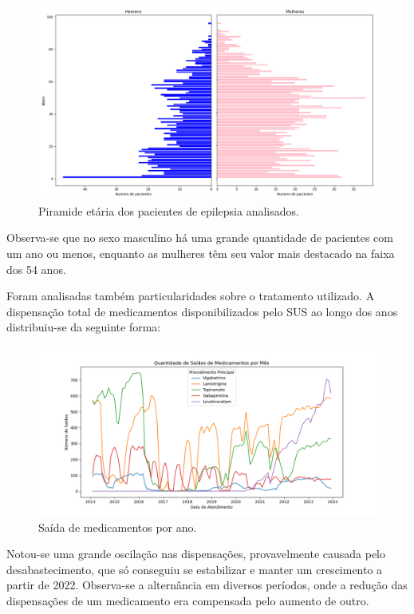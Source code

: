 \documentclass[article,a4paper,12pt,brazil,sumario=tradicional]{abntex2}
\begin{document}
\begin{figure}[ht!]
    \centering
    \includegraphics[width=1\textwidth]{piramide_etaria_completa.png}
    \caption{Piramide etária dos pacientes de epilepsia analisados.}
    \label{fig:piramide_etaria_completa}
\end{figure}

Observa-se que no sexo masculino há uma grande quantidade de pacientes com um ano ou menos, enquanto as mulheres têm seu valor mais destacado na faixa dos 54 anos.

Foram analisadas também particularidades sobre o tratamento utilizado. A dispensação total de medicamentos disponibilizados pelo SUS ao longo dos anos distribuiu-se da seguinte forma:

\begin{figure}[!ht]
    \centering
    \includegraphics[width=1\textwidth]{saida_medicamentos_por_mes.png}
    \caption{Saída de medicamentos por ano.}
    \label{fig:saida_medicamentos_por_mes}
\end{figure}

Notou-se uma grande oscilação nas dispensações, provavelmente causada pelo desabastecimento, que só conseguiu se estabilizar e manter um crescimento a partir de 2022. Observa-se a alternância em diversos períodos, onde a redução das dispensações de um medicamento era compensada pelo aumento de outro.
\end{document}
